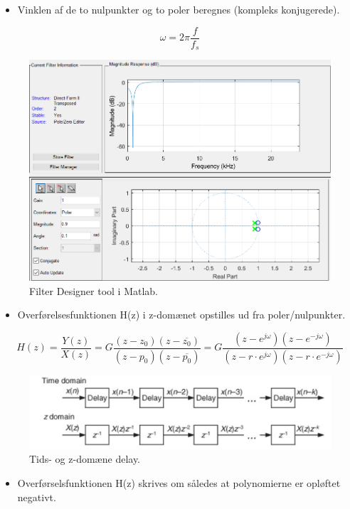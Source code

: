 \documentclass[danish]{article}
\begin{document}
\begin{itemize}
	\item Vinklen af de to nulpunkter og to poler beregnes (kompleks konjugerede).
\end{itemize}

\begin{equation}
\omega = 2\pi \frac{f}{f_s}
\end{equation}

\begin{figure}[H]
	\centering
	\includegraphics[width=0.6\linewidth]{graphics/notchfilter}
	\caption{Filter Designer tool i Matlab.}
	\label{fig:notchfilter}
\end{figure}

\begin{itemize}
	\item Overførelsesfunktionen H(z) i z-domænet opstilles ud fra poler/nulpunkter.
\end{itemize}

\begin{equation}
H(z) = \frac{Y(z)}{X(z)} = G \frac{(z - z_0)(z-\overline{z_0})}{(z - p_0)(z-\overline{p_0})} = G \frac{(z - e^{j\omega})(z - e^{-j\omega})}{(z - r\cdot  e^{j\omega})(z-r\cdot e^{-j\omega})}
\end{equation}

\begin{figure}[H]
	\centering
	\includegraphics[width=0.6\linewidth]{graphics/z_domain_delay}
	\caption{Tids- og z-domæne delay.}
	\label{fig:z_domain_delay}
\end{figure}

\begin{itemize}
	\item Overførselsfunktionen H(z) skrives om således at polynomierne er opløftet negativt.
\end{itemize}
\end{document}
